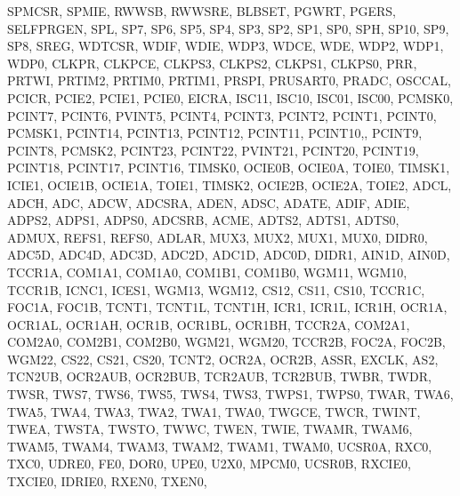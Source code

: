 {{                SPMCSR, SPMIE, RWWSB, RWWSRE, BLBSET, PGWRT, 
                PGERS, SELFPRGEN,
                SPL, SP7, SP6, SP5, SP4, SP3, SP2, SP1, SP0, 
                SPH, SP10, SP9, SP8,
                SREG, 
                WDTCSR, WDIF, WDIE, WDP3, WDCE, WDE, WDP2, 
                WDP1, WDP0,
                CLKPR, CLKPCE, CLKPS3, CLKPS2, CLKPS1, CLKPS0,
                PRR, PRTWI, PRTIM2, PRTIM0, PRTIM1, PRSPI, 
                PRUSART0, PRADC,
                OSCCAL,
                PCICR, PCIE2, PCIE1, PCIE0,
                EICRA, ISC11, ISC10, ISC01, ISC00,
                PCMSK0, PCINT7, PCINT6, PVINT5, PCINT4, PCINT3, 
                PCINT2, PCINT1, PCINT0,
                PCMSK1, PCINT14, PCINT13, PCINT12, PCINT11, 
                PCINT10,, PCINT9, PCINT8,
                PCMSK2, PCINT23, PCINT22, PVINT21, PCINT20, 
                PCINT19, PCINT18, PCINT17, PCINT16,
                TIMSK0, OCIE0B, OCIE0A, TOIE0,
                TIMSK1, ICIE1, OCIE1B, OCIE1A, TOIE1,
                TIMSK2, OCIE2B, OCIE2A, TOIE2,
                ADCL, ADCH, ADC, ADCW,
                ADCSRA, ADEN, ADSC, ADATE, ADIF, ADIE, ADPS2, 
                ADPS1, ADPS0,
                ADCSRB, ACME, ADTS2, ADTS1, ADTS0,
                ADMUX, REFS1, REFS0, ADLAR, MUX3, MUX2, MUX1, 
                MUX0,
                DIDR0, ADC5D, ADC4D, ADC3D, ADC2D, ADC1D, ADC0D,
                DIDR1, AIN1D, AIN0D,
                TCCR1A, COM1A1, COM1A0, COM1B1, COM1B0, WGM11, 
                WGM10,
                TCCR1B, ICNC1, ICES1, WGM13, WGM12, CS12, CS11, 
                CS10,
                TCCR1C, FOC1A, FOC1B,
                TCNT1, TCNT1L, TCNT1H,
                ICR1, ICR1L, ICR1H,
                OCR1A, OCR1AL, OCR1AH,
                OCR1B, OCR1BL, OCR1BH,
                TCCR2A, COM2A1, COM2A0, COM2B1, COM2B0, WGM21, 
                WGM20,
                TCCR2B, FOC2A, FOC2B, WGM22, CS22, CS21, CS20,
                TCNT2, OCR2A, OCR2B,
                ASSR, EXCLK, AS2, TCN2UB, OCR2AUB, OCR2BUB, 
                TCR2AUB, TCR2BUB,
                TWBR, TWDR,
                TWSR, TWS7, TWS6, TWS5, TWS4, TWS3, TWPS1, 
                TWPS0,
                TWAR, TWA6, TWA5, TWA4, TWA3, TWA2, TWA1, TWA0, 
                TWGCE,
                TWCR, TWINT, TWEA, TWSTA, TWSTO, TWWC, TWEN, 
                TWIE,
                TWAMR, TWAM6, TWAM5, TWAM4, TWAM3, TWAM2, 
                TWAM1, TWAM0,
                UCSR0A, RXC0, TXC0, UDRE0, FE0, DOR0, UPE0, 
                U2X0, MPCM0,
                UCSR0B, RXCIE0, TXCIE0, IDRIE0, RXEN0, TXEN0, 
}}
